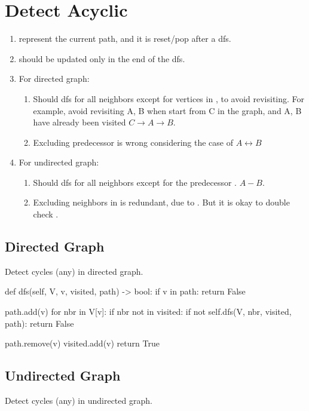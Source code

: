 \section{Detect Acyclic}
\begin{enumerate}
\item {} represent the current path, and it is reset/pop after a dfs.
\item {} should be updated only in the end of the dfs.
\item For directed graph:
\begin{enumerate}
\item Should dfs for all neighbors except for vertices in , to avoid revisiting. For example, avoid revisiting A, B when start from C in the graph, and A, B have already been visited $C \rightarrow A \rightarrow B$.
\item Excluding predecessor  is wrong considering the case of $A \leftrightarrow B$
\end{enumerate}
\item For undirected graph:
\begin{enumerate}
\item Should dfs for all neighbors except for the predecessor . $A-B$.
\item Excluding neighbors in  is redundant, due to . But it is okay to double check .
\end{enumerate}
\end{enumerate}

\subsection{Directed Graph}
Detect cycles (any) in directed graph.

\begin{python}
def dfs(self, V, v, visited, path) -> bool:
  if v in path:
    return False

  path.add(v)
  for nbr in V[v]:
    if nbr not in visited:
      if not self.dfs(V, nbr, visited, path):
        return False

  path.remove(v)
  visited.add(v)
  return True
\end{python}


\subsection{Undirected Graph}
Detect cycles (any) in undirected graph.

